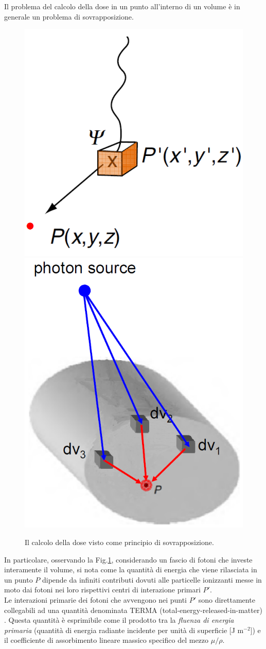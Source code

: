 {Il problema del calcolo della dose in un punto all'interno di un volume è in generale un problema di sovrapposizione.
\begin{figure}
\centering
\includegraphics[width=.45\textwidth]{./cap1/superp1.png}
\includegraphics[width=.45\textwidth]{./cap1/superp2.png}
\caption{Il calcolo della dose visto come principio di sovrapposizione.}
\label{fig:superp}
\end{figure}
In particolare, osservando la Fig.\ref{fig:superp}, considerando un fascio di fotoni che investe interamente il volume, si nota come la quantità di energia che viene rilasciata in un punto $P$ dipende da infiniti contributi dovuti alle particelle ionizzanti messe in moto dai fotoni nei loro rispettivi centri di interazione primari $P'$.\\
Le interazioni primarie dei fotoni che avvengono nei punti $P'$ sono direttamente collegabili ad una quantità denominata TERMA (total-energy-released-in-matter) \cite{Ahnesjo1987}. Questa quantità è esprimibile come il prodotto tra la \textit{fluenza di energia primaria} (quantità di energia radiante incidente per unità di superficie [J m$^{-2}$]) e il coefficiente di assorbimento lineare massico specifico del mezzo $\mu/\rho$.

}
